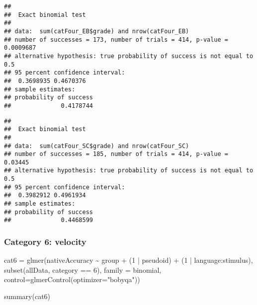 \documentclass[
]{article}
\newenvironment{Shaded}{\begin{snugshade}}{\end{snugshade}}
\newcommand{\AttributeTok}[1]{\textcolor[rgb]{0.77,0.63,0.00}{#1}}
\newcommand{\DecValTok}[1]{\textcolor[rgb]{0.00,0.00,0.81}{#1}}
\newcommand{\FunctionTok}[1]{\textcolor[rgb]{0.00,0.00,0.00}{#1}}
\newcommand{\NormalTok}[1]{#1}
\newcommand{\OtherTok}[1]{\textcolor[rgb]{0.56,0.35,0.01}{#1}}
\newcommand{\SpecialCharTok}[1]{\textcolor[rgb]{0.00,0.00,0.00}{#1}}
\newcommand{\StringTok}[1]{\textcolor[rgb]{0.31,0.60,0.02}{#1}}
\begin{document}
\begin{verbatim}
## 
##  Exact binomial test
## 
## data:  sum(catFour_EB$grade) and nrow(catFour_EB)
## number of successes = 173, number of trials = 414, p-value = 0.0009687
## alternative hypothesis: true probability of success is not equal to 0.5
## 95 percent confidence interval:
##  0.3698935 0.4670376
## sample estimates:
## probability of success 
##              0.4178744
\end{verbatim}

\begin{Shaded}
\end{Shaded}

\begin{verbatim}
## 
##  Exact binomial test
## 
## data:  sum(catFour_SC$grade) and nrow(catFour_SC)
## number of successes = 185, number of trials = 414, p-value = 0.03445
## alternative hypothesis: true probability of success is not equal to 0.5
## 95 percent confidence interval:
##  0.3982912 0.4961934
## sample estimates:
## probability of success 
##              0.4468599
\end{verbatim}

\hypertarget{category-6-velocity}{%
\subsubsection{Category 6: velocity}\label{category-6-velocity}}

\begin{Shaded}
\begin{Highlighting}[]
\NormalTok{cat6 }\OtherTok{=} \FunctionTok{glmer}\NormalTok{(nativeAccuracy }\SpecialCharTok{\textasciitilde{}}\NormalTok{ group }\SpecialCharTok{+}
\NormalTok{        (}\DecValTok{1} \SpecialCharTok{|}\NormalTok{ pseudoid) }\SpecialCharTok{+}\NormalTok{ (}\DecValTok{1} \SpecialCharTok{|}\NormalTok{ language}\SpecialCharTok{:}\NormalTok{stimulus),}
      \FunctionTok{subset}\NormalTok{(allData, category }\SpecialCharTok{==} \DecValTok{6}\NormalTok{),}
      \AttributeTok{family =}\NormalTok{ binomial,}
      \AttributeTok{control=}\FunctionTok{glmerControl}\NormalTok{(}\AttributeTok{optimizer=}\StringTok{"bobyqa"}\NormalTok{))}

\FunctionTok{summary}\NormalTok{(cat6)}
\end{Highlighting}
\end{Shaded}
\end{document}
